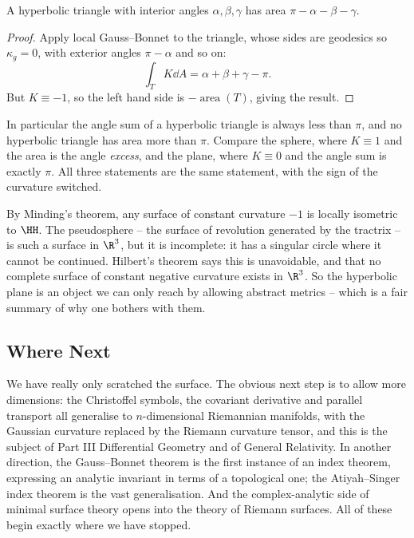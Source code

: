 \begin{theorem}
    A hyperbolic triangle with interior angles $\alpha,\beta,\gamma$ has area $\pi - \alpha-\beta-\gamma$.
\end{theorem}
\begin{proof}
    Apply local Gauss--Bonnet to the triangle, whose sides are geodesics so $\kappa_g = 0$, with exterior angles $\pi - \alpha$ and so on:
    $$
    \int_T K \dd A = \alpha+\beta+\gamma-\pi.
    $$
    But $K \equiv -1$, so the left hand side is $-\operatorname{area}(T)$, giving the result.
\end{proof}

In particular the angle sum of a hyperbolic triangle is always less than $\pi$, and no hyperbolic triangle has area more than $\pi$. Compare the sphere, where $K \equiv 1$ and the area is the angle \emph{excess}, and the plane, where $K \equiv 0$ and the angle sum is exactly $\pi$. All three statements are the same statement, with the sign of the curvature switched.

\begin{remark}
    By Minding's theorem, any surface of constant curvature $-1$ is locally isometric to $\HH$. The pseudosphere -- the surface of revolution generated by the tractrix -- is such a surface in $\R^3$, but it is incomplete: it has a singular circle where it cannot be continued. Hilbert's theorem says this is unavoidable, and that no complete surface of constant negative curvature exists in $\R^3$. So the hyperbolic plane is an object we can only reach by allowing abstract metrics -- which is a fair summary of why one bothers with them.
\end{remark}

\subsection*{Where Next}

We have really only scratched the surface. The obvious next step is to allow more dimensions: the Christoffel symbols, the covariant derivative and parallel transport all generalise to $n$-dimensional Riemannian manifolds, with the Gaussian curvature replaced by the Riemann curvature tensor, and this is the subject of Part III Differential Geometry and of General Relativity. In another direction, the Gauss--Bonnet theorem is the first instance of an index theorem, expressing an analytic invariant in terms of a topological one; the Atiyah--Singer index theorem is the vast generalisation. And the complex-analytic side of minimal surface theory opens into the theory of Riemann surfaces. All of these begin exactly where we have stopped.


